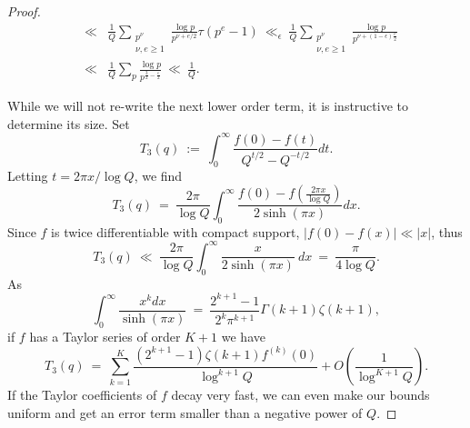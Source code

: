 \documentclass[12pt,reqno]{amsart}
\numberwithin{equation}{section}
\theoremstyle{plain}
\begin{document}
\begin{proof}
\begin{eqnarray}
& \ll& \frac 1Q \sum_{\substack{p^{\nu} \\ \nu, e\geq 1}} \frac{\log p}{p^{\nu+e/2}} \tau(p^e-1)\ \ll_{\epsilon}\ \frac 1Q \sum_{\substack{p^{\nu} \\ \nu, e\geq 1}} \frac{\log p}{p^{\nu+(1-\epsilon) \frac e2}} \nonumber\\
&\ll& \frac 1Q \sum_{p} \frac{\log p}{p^{\frac 32-\frac{\epsilon}2}} \ \ll\ \frac 1Q.
\label{eq:average of T_2 is small}
 \end{eqnarray}

While we will not re-write the next lower order term, it is instructive to determine its size. Set
\begin{equation} T_3(q) \ :=\ \int_0^{\infty}\frac{f(0)-f(t)}{Q^{t/2}-Q^{-t/2}} dt. \end{equation} Letting $t = 2\pi x / \log Q$, we find
\begin{equation}\label{eq:T3qwithexp} T_3(q) \ = \ \frac{2\pi}{\log Q}\int_0^{\infty} \frac{f(0)-f\left(\frac{2\pi x}{\log Q}\right)}{2\sinh(\pi x)}dx.\end{equation} Since $f$ is twice differentiable with compact support, $|f(0)-f(x)|\ll |x|$, thus \begin{equation} T_3(q) \ \ll \ \frac{2\pi}{\log Q} \int_0^\infty \frac{x}{2\sinh(\pi x)}\ dx \ = \ \frac{\pi}{4\log Q}.\end{equation}
As \begin{equation} \int_0^\infty \frac{x^k dx}{\sinh(\pi x)} \ = \ \frac{2^{k+1}-1}{2^k \pi^{k+1}} \Gamma(k+1)\zeta(k+1),\end{equation}
if $f$ has a Taylor series of order $K+1$ we have \begin{equation} T_3(q) \ = \ \sum_{k=1}^K \frac{(2^{k+1}-1) \zeta(k+1)f^{(k)}(0)}{\log^{k+1} Q} + O\left(\frac{1}{\log^{K+1} Q}\right).\end{equation}
If the Taylor coefficients of $f$ decay very fast, we can even make our bounds uniform and get an error term smaller than a negative power of $Q$.


\end{proof}
\end{document}
